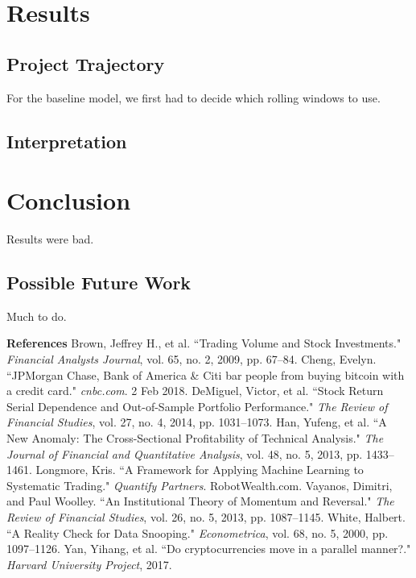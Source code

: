 \documentclass[12pt,twoside]{article}
\begin{document}
\section{Results}

\subsection{Project Trajectory}

For the baseline model, we first had to decide which rolling windows to use. 

\subsection{Interpretation}



\section{Conclusion}

Results were bad.

\subsection{Possible Future Work}

Much to do.

\newpage
{\large \textbf{References}}
\bigbreak
Brown, Jeffrey H., et al. ``Trading Volume and Stock Investments." \textit{Financial Analysts Journal}, vol. 65, no. 2, 2009, pp. 67–84.
\bigbreak
Cheng, Evelyn. ``JPMorgan Chase, Bank of America \& Citi bar people from buying bitcoin with a credit card." \textit{cnbc.com}. 2 Feb 2018.
\bigbreak
DeMiguel, Victor, et al. ``Stock Return Serial Dependence and Out-of-Sample Portfolio Performance." \textit{The Review of Financial Studies}, vol. 27, no. 4, 2014, pp. 1031–1073.
\bigbreak
Han, Yufeng, et al. ``A New Anomaly: The Cross-Sectional Profitability of Technical Analysis." \textit{The Journal of Financial and Quantitative Analysis}, vol. 48, no. 5, 2013, pp. 1433–1461.
\bigbreak
Longmore, Kris. ``A Framework for Applying Machine Learning to Systematic Trading." \textit{Quantify Partners}. RobotWealth.com.
\bigbreak
Vayanos, Dimitri, and Paul Woolley. ``An Institutional Theory of Momentum and Reversal." \textit{The Review of Financial Studies}, vol. 26, no. 5, 2013, pp. 1087–1145.
\bigbreak
White, Halbert. ``A Reality Check for Data Snooping." \textit{Econometrica}, vol. 68, no. 5, 2000, pp. 1097–1126.
\bigbreak
Yan, Yihang, et al. ``Do cryptocurrencies move in a parallel manner?." \textit{Harvard University Project}, 2017.
\bigbreak
\end{document}
